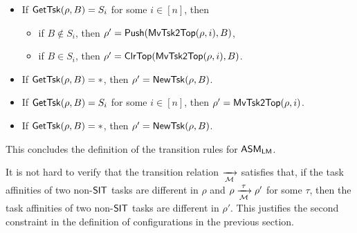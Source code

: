 	\noindent {}
	\begin{itemize}
		\item If $\mathsf{GetTsk}(\rho, B) = S_i$ for some $i\in[n]$, then
		\begin{itemize}
			\item if $B \not \in S_i$, then $\rho' = \mathsf{Push}(\mathsf{MvTsk2Top}(\rho, i), B)$,
			\item if $B  \in S_i$, 	then $\rho' =  \mathsf{ClrTop}(\mathsf{MvTsk2Top}(\rho, i), B)$.
		\end{itemize}
		\item If $\mathsf{GetTsk}(\rho, B) = *$, then $\rho' = \mathsf{NewTsk}(\rho, B)$.
	\end{itemize}
	
	\noindent {}
	\begin{itemize}
		\item If $\mathsf{GetTsk}(\rho, B) = S_i$ for some $i \in [n]$, then $\rho' = \mathsf{MvTsk2Top}(\rho, i)$.
		\item If $\mathsf{GetTsk}(\rho, B) = *$, then $\rho' = \mathsf{NewTsk}(\rho, B)$.
	\end{itemize}
	
	This concludes the definition of the transition rules for $\textsf{ASM}_\textsf{LM}$. 
	
	
	

It is not hard to verify that the transition relation $\xrightarrow[{\mathcal{M} }]{}$ %
	satisfies that, if the task affinities of two non-${\sf SIT}$ tasks are different in $\rho$ and $\rho \xrightarrow[{\mathcal{M} }]{\tau} \rho'$ for some $\tau$, then the task affinities of two non-${\sf SIT}$ tasks are different in $\rho'$. This justifies the second constraint in the definition of configurations in the previous section. 
	
